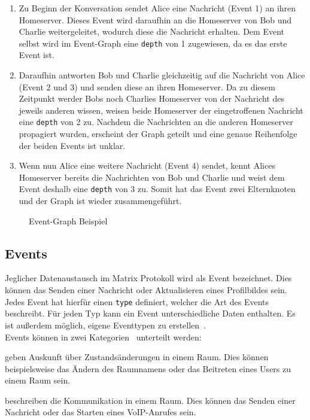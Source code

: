     \begin{enumerate}[label={(\arabic*)}]
    \item Zu Beginn der Konversation sendet Alice eine Nachricht (Event 1) an ihren Homeserver.
    Dieses Event wird daraufhin an die Homeserver von Bob und Charlie weitergeleitet, wodurch diese die Nachricht erhalten.
    Dem Event selbst wird im Event-Graph eine \texttt{depth} von 1 zugewiesen, da es das erste Event ist.
    \item Daraufhin antworten Bob und Charlie gleichzeitig auf die Nachricht von Alice (Event 2 und 3) und senden diese an ihren Homeserver.
    Da zu diesem Zeitpunkt werder Bobs noch Charlies Homeserver von der Nachricht des jeweils anderen wissen, weisen beide Homeserver der eingetroffenen Nachricht eine \texttt{depth} von 2 zu.
    Nachdem die Nachrichten an die anderen Homeserver propagiert wurden, erscheint der Graph geteilt und eine genaue Reihenfolge der beiden Events ist unklar.
    \item Wenn nun Alice eine weitere Nachricht (Event 4) sendet, kennt Alices Homeserver bereits die Nachrichten von Bob und Charlie und weist dem Event deshalb eine \texttt{depth} von 3 zu.
    Somit hat das Event zwei Elternknoten und der Graph ist wieder zusammengeführt.
    \end{enumerate}

\begin{figure}[h]
    \centering
    
    \caption{Event-Graph Beispiel}
    \label{fig:events}
\end{figure}

    \newpage
    \subsection{Events}\label{sec:events}
    Jeglicher Datenaustausch im Matrix Protokoll wird als Event bezeichnet.
    Dies können das Senden einer Nachricht oder Aktualisieren eines Profilbildes sein.
    Jedes Event hat hierfür einen \texttt{type} definiert, welcher die Art des Events beschreibt.
    Für jeden Typ kann ein Event unterschiedliche Daten enthalten.
    Es ist außerdem möglich, eigene Eventtypen zu erstellen~\cite{events}.\\
    Events können in zwei Kategorien~\cite{roomevents} unterteilt werden:
    \begin{description}[leftmargin=!,labelwidth=3.5cm]
        \item [State events] geben Auskunft über Zustandsänderungen in einem Raum. Dies können beispielsweise das Ändern des Raumnamens oder das Beitreten eines Users zu einem Raum sein.
        \item [Message events] beschreiben die Kommunikation in einem Raum. Dies können das Senden einer Nachricht oder das Starten eines VoIP-Anrufes sein.
    \end{description}

